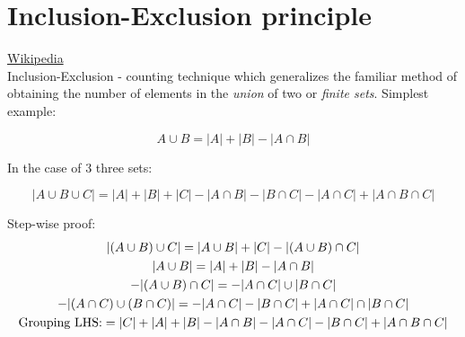 \documentclass[11]{article}
\begin{document}

\section*{Inclusion-Exclusion principle} \href{https://en.wikipedia.org/wiki/Inclusion%E2%80%93exclusion_principle}{Wikipedia} \\

Inclusion-Exclusion - counting technique which generalizes the familiar method of obtaining the number of elements in the \textit{union} of two or \textit{finite sets}. Simplest example:

\begin{equation}
    A \cup B = |A| + |B| - |A \cap B|
\end{equation}

In the case of 3 three sets:

\begin{equation}
    | A \cup B \cup C| = |A| + |B| + |C| - |A \cap B| - |B \cap C| - |A \cap C| + |A \cap B \cap C|
\end{equation}

Step-wise proof:
\begin{gather}
    | (A \cup B) \cup C| = |A \cup B| + |C| - |(A \cup B) \cap C| \\
    | A \cup B| = |A| + |B| - |A \cap B| \\
    -| (A \cup B) \cap C| = -|A \cap C| \cup |B \cap C| \\
    -|(A \cap C) \cup (B \cap C)| = -|A \cap C| - |B \cap C| +
    | A \cap C| \cap |B \cap C| \\
    \textnormal{Grouping LHS:} = |C| + |A| + |B| - |A \cap B| - |A \cap C|- |B \cap C| + |A \cap B \cap C|
\end{gather}
\end{document}
